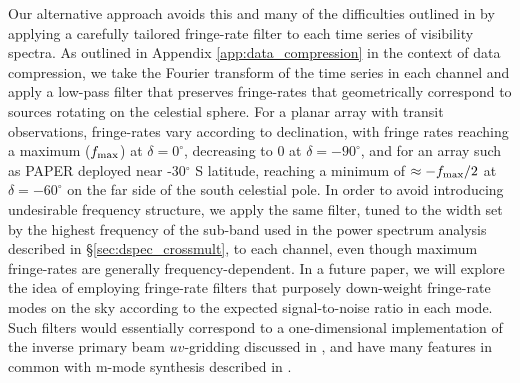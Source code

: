 \documentclass[twocolumn,numberedappendix]{emulateapj}
\begin{document}
Our alternative approach avoids this and many of the difficulties outlined
in \citet{hazelton_et_al2013} by applying a carefully tailored
fringe-rate filter to each time series of visibility spectra.  As outlined in Appendix \ref{app:data_compression}
in the context of data compression, we
take the Fourier transform of the time series in each channel and apply a low-pass filter that preserves
fringe-rates that geometrically correspond to sources rotating on the celestial sphere.  
For a planar array with transit observations, fringe-rates vary according to declination, with fringe rates
reaching a maximum ($f_{\rm max}$) at 
$\delta=0^\circ$, decreasing to 0 at $\delta=-90^\circ$, and for an array such as PAPER deployed near
-30$^\circ$ S latitude, reaching a minimum of $\approx-f_{\rm max}/2$ at $\delta=-60^\circ$ on
the far side of the south celestial pole.
In order to
avoid introducing undesirable frequency structure, we apply the same filter, tuned to the width
set by the highest frequency of the sub-band used in the
power spectrum analysis described
in \S\ref{sec:dspec_crossmult}, to each channel,
even though maximum fringe-rates are generally frequency-dependent.
In a future paper, we will explore the idea
of employing fringe-rate filters that purposely down-weight fringe-rate modes on the sky according to
the expected signal-to-noise ratio in each mode.  Such filters would essentially correspond to a
one-dimensional implementation of the inverse primary beam $uv$-gridding discussed in \citet{morales_matejek2009},
and have many features in common with m-mode synthesis described in \citet{shaw_et_al2013}.
\end{document}
